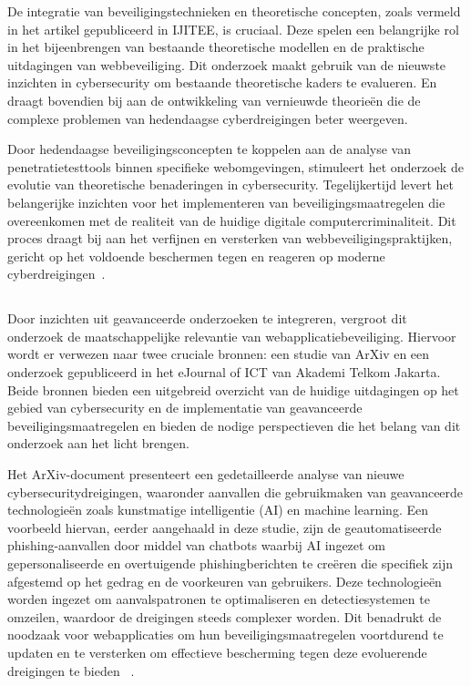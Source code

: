 De integratie van beveiligingstechnieken en theoretische concepten, zoals vermeld in het artikel gepubliceerd in IJITEE, is cruciaal. Deze spelen een belangrijke rol 
in het bijeenbrengen van bestaande theoretische modellen en de praktische uitdagingen van webbeveiliging. Dit onderzoek maakt gebruik van de nieuwste inzichten in cybersecurity 
om bestaande theoretische kaders te evalueren. En draagt bovendien bij aan de ontwikkeling van vernieuwde theorieën die de complexe problemen van hedendaagse 
cyberdreigingen beter weergeven. 

Door hedendaagse beveiligingsconcepten te koppelen aan de analyse van penetratietesttools binnen specifieke webomgevingen, 
stimuleert het onderzoek de evolutie van theoretische benaderingen in cybersecurity. Tegelijkertijd levert het belangerijke inzichten voor het implementeren van beveiligingsmaatregelen
die overeenkomen met de realiteit van de huidige digitale computercriminaliteit.
Dit proces draagt bij aan het verfijnen en versterken van webbeveiligingspraktijken, gericht op het voldoende beschermen tegen en reageren op moderne 
cyberdreigingen~\autocite{Nagendran2019}.

\subsection{}
Door inzichten uit geavanceerde onderzoeken te integreren, vergroot dit onderzoek de maatschappelijke relevantie van webapplicatiebeveiliging. Hiervoor wordt er verwezen naar 
twee cruciale bronnen: een studie van ArXiv en een onderzoek gepubliceerd in het eJournal of ICT van Akademi Telkom Jakarta. Beide bronnen bieden een uitgebreid overzicht 
van de huidige uitdagingen op het gebied van cybersecurity en de implementatie van geavanceerde beveiligingsmaatregelen en bieden de nodige perspectieven die het 
belang van dit onderzoek aan het licht brengen.

Het ArXiv-document presenteert een gedetailleerde analyse van nieuwe cybersecuritydreigingen, waaronder aanvallen die gebruikmaken van geavanceerde technologieën zoals 
kunstmatige intelligentie (AI) en machine learning. Een voorbeeld hiervan, eerder aangehaald in deze studie, zijn de geautomatiseerde phishing-aanvallen door middel van chatbots waarbij AI ingezet om 
gepersonaliseerde en overtuigende phishingberichten te creëren die specifiek zijn afgestemd op het gedrag en de voorkeuren van gebruikers. Deze technologieën worden ingezet om 
aanvalspatronen te optimaliseren en detectiesystemen te omzeilen, waardoor de dreigingen steeds complexer worden. Dit benadrukt de noodzaak voor webapplicaties om hun 
beveiligingsmaatregelen voortdurend te updaten en te versterken om effectieve bescherming tegen deze evoluerende dreigingen te bieden ~\autocite{Deng2023}.

